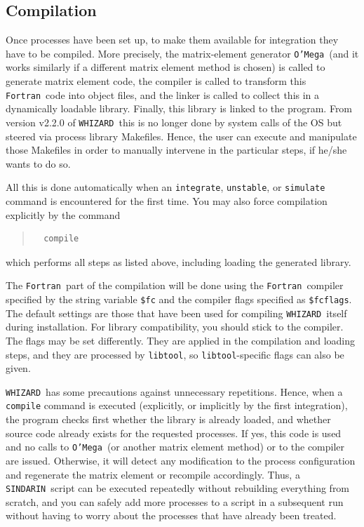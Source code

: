 \documentclass[12pt]{book}
\newcommand{\ttt}[1]{\texttt{#1}}
\newcommand{\whizard}{\ttt{WHIZARD}}
\newcommand{\oMega}{\ttt{O'Mega}}
\newcommand{\sindarin}{\ttt{SINDARIN}}
\newcommand{\fortran}{\ttt{Fortran}}
\begin{document}

\subsection{Compilation}
\label{sec:compilation}

Once processes have been set up, to make them available for integration they
have to be compiled.  More precisely, the matrix-element generator
\oMega\ (and it works similarly if a different matrix element method
is chosen) is called to generate matrix element code, the compiler is
called to transform this \fortran\ code into object files, and the
linker is called to collect this in a dynamically loadable library.
Finally, this library is linked to the program. From version v2.2.0 of
\whizard\ this is no longer done by system calls of the OS but steered
via process library Makefiles. Hence, the user can execute and
manipulate those Makefiles in order to manually intervene in the
particular steps, if he/she wants to do so.

All this is done automatically when an \ttt{integrate}, \ttt{unstable}, or
\ttt{simulate} command is encountered for the first time.  You may also force
compilation explicitly by the command
\begin{quote}
\begin{footnotesize}
\begin{verbatim}
  compile
\end{verbatim}
\end{footnotesize}
\end{quote}
which performs all steps as listed above, including loading the generated
library.

The \fortran\ part of the compilation will be done using the \fortran\ compiler
specified by the string variable
\verb|$fc| and the compiler flags specified as \verb|$fcflags|.  The default
settings are those that have been used for compiling \whizard\ itself during
installation.  For library compatibility, you should stick to the compiler.
The flags may be set differently.  They are applied in the compilation and
loading steps, and they are processed by \ttt{libtool}, so
\ttt{libtool}-specific flags can also be given.

\whizard\ has some precautions against unnecessary repetitions.  Hence, when a
\ttt{compile} command is executed (explicitly, or implicitly by the first
integration), the program checks first whether the library is already loaded,
and whether source code already exists for the requested processes.  If yes,
this code is used and no calls to \oMega\ (or another matrix element
method) or to the compiler are issued.
Otherwise, it will detect any modification to the process configuration and
regenerate the matrix element or recompile accordingly.  Thus, a \sindarin\
script can be executed repeatedly without rebuilding everything from scratch,
and you can safely add more processes to a script in a subsequent run without
having to worry about the processes that have already been treated.
\end{document}
